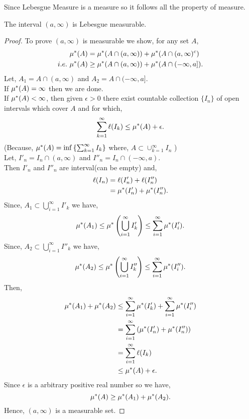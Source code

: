 Since Lebesgue Measure is a measure so it follows all the property of measure.

\begin{theorem}
    \label{open mesure}
    The interval $(a,\infty)$ is Lebesgue measurable.
\end{theorem}
\begin{proof}
    To prove $(a,\infty)$ is measurable we show, for any set $A$,
    \begin{align*}
        \mu^{*}(A)&=\mu^{*}(A\cap(a,\infty))+\mu^{*}(A\cap(a,\infty)^{c})\\
        i.e.\ \mu^{*}(A)&\ge \mu^{*}(A\cap(a,\infty))+\mu^{*}(A\cap(-\infty,a]).
    \end{align*}
    Let, $A_1=A\cap(a,\infty)$ and $A_2=A\cap(-\infty,a]$.\\
    If $\mu^{*}(A)=\infty$ then we are done.\\
    If $\mu^{*}(A)<\infty$, then given $\epsilon>0$ there exist countable collection  $\{I_n\}$ of open intervals which cover  $A$ and for which,
    \[
        \sum_{k=1}^{\infty}\ell(I_k)\le \mu^{*}(A)+\epsilon.
    \]
    (Because, $\mu^{*}(A)=\inf\left\{ \sum_{k=1}^{\infty}I_k \right\}$ where, $A\subset\cup_{k=1}^{\infty}I_n$ )\\
    Let, $I'_n=I_n\cap(a,\infty)$ and $I''_n=I_n\cap(-\infty,a)$.\\
    Then $I'_n$ and  $I''_n$ are interval(can be empty) and,
    \begin{align*}
        \ell(I_n)&=\ell(I'_n)+\ell(I''_n)\\
                 &=\mu^{*}(I'_n)+\mu^{*}(I''_n).
    \end{align*}
    Since, $A_1\subset\bigcup_{i=1}^{\infty}I'_k$ we have,
    \[
        \mu^{*}(A_1)\le \mu^{*}\left( \bigcup_{i=1}^{\infty}I'_k \right) \le \sum_{i=1}^{\infty}\mu^{*}(I'_i).
    \]
    Since, $A_2\subset\bigcup_{i=1}^{\infty}I''_k$ we have,
    \[
        \mu^{*}(A_2)\le \mu^{*}\left( \bigcup_{i=1}^{\infty}I''_k \right) \le \sum_{i=1}^{\infty}\mu^{*}(I''_i).
    \]
    Then,
    \begin{align*}
        \mu^{*}(A_1)+\mu^{*}(A_2)&\le \sum_{i=1}^{\infty}\mu^{*}(I'_k)+\sum_{i=1}^{\infty}\mu^{*}(I''_i)\\
                           &=\sum_{i=1}^{\infty}\left( \mu^{*}(I'_n)+\mu^{*}(I''_n) \right)\\
                           &=\sum_{i=1}^{\infty}\ell(I_k)\\
                           &\le \mu^{*}(A)+\epsilon.
    \end{align*}
    Since $\epsilon$ is a arbitrary positive real number so we have,
    \[
        \mu^{*}(A)\ge \mu^{*}(A_1)+\mu^{*}(A_2).
    \]
    Hence, $(a,\infty)$ is a measurable set.
\end{proof}

